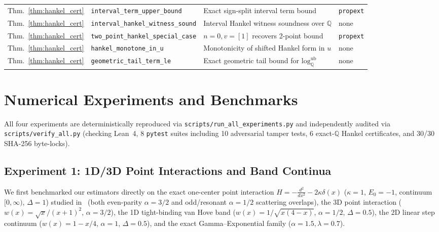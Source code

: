 \documentclass[11pt,a4paper]{article}
\theoremstyle{definition}
\newcommand{\Q}{\mathbb{Q}}
\begin{document}
\begin{table}[t]
{\begin{tabular}{@{}llll@{}}
Thm.~\ref{thm:hankel_cert} & \texttt{interval\_term\_upper\_bound} & Exact sign-split interval term bound & \texttt{propext} \\
Thm.~\ref{thm:hankel_cert} & \texttt{interval\_hankel\_witness\_sound} & Interval Hankel witness soundness over $\Q$ & none \\
Thm.~\ref{thm:hankel_cert} & \texttt{two\_point\_hankel\_special\_case} & $n=0, v=[1]$ recovers 2-point bound & \texttt{propext} \\
Thm.~\ref{thm:hankel_cert} & \texttt{hankel\_monotone\_in\_u} & Monotonicity of shifted Hankel form in $u$ & none \\
Thm.~\ref{thm:hankel_cert} & \texttt{geometric\_tail\_term\_le} & Exact geometric tail bound for $\mathrm{log}_{\Q}^{\mathrm{ub}}$ & none \\
\bottomrule
\end{tabular}%
}
\end{table}

\section{Numerical Experiments and Benchmarks}
\label{sec:experiments}

All four experiments are deterministically reproduced via \texttt{scripts/run\_all\_experiments.py} and independently audited via \texttt{scripts/verify\_all.py} (checking Lean~4, 8 \texttt{pytest} suites including 10 adversarial tamper tests, 6 exact-$\Q$ Hankel certificates, and 30/30 SHA-256 byte-locks).

\subsection{Experiment 1: 1D/3D Point Interactions and Band Continua}

We first benchmarked our estimators directly on the exact one-center point interaction $H = -\frac{d^2}{dx^2} - 2\kappa\delta(x)$ ($\kappa = 1$, $E_0 = -1$, continuum $[0, \infty)$, $\Delta = 1$) studied in~\cite{Karapetyan2026Beyond} (both even-parity $\alpha = 3/2$ and odd/resonant $\alpha = 1/2$ scattering overlaps), the 3D point interaction ($w(x) = \sqrt{x}/(x+1)^2$, $\alpha = 3/2$), the 1D tight-binding van Hove band ($w(x) = 1/\sqrt{x(4-x)}$, $\alpha = 1/2$, $\Delta = 0.5$), the 2D linear step continuum ($w(x) = 1 - x/4$, $\alpha = 1$, $\Delta = 0.5$), and the exact Gamma--Exponential family ($\alpha = 1.5, \lambda = 0.7$).
\end{document}
